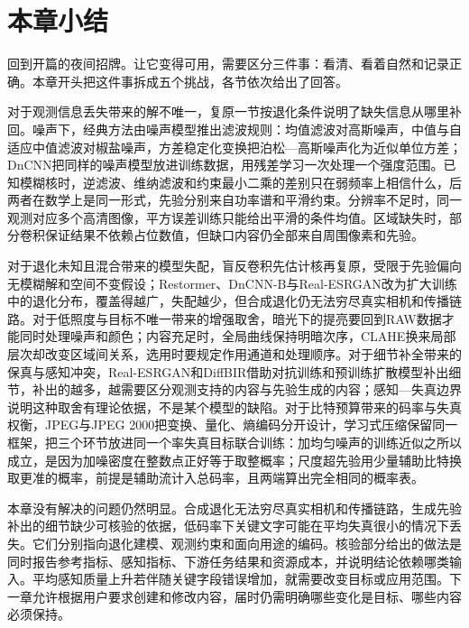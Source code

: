 \section{本章小结}
\label{sec:vision-restoration-summary}

回到开篇的夜间招牌。让它变得可用，需要区分三件事：看清、看着自然和记录正确。本章开头把这件事拆成五个挑战，各节依次给出了回答。

对于观测信息丢失带来的解不唯一，复原一节按退化条件说明了缺失信息从哪里补回。噪声下，经典方法由噪声模型推出滤波规则：均值滤波对高斯噪声，中值与自适应中值滤波对椒盐噪声，方差稳定化变换把泊松—高斯噪声化为近似单位方差；DnCNN把同样的噪声模型放进训练数据，用残差学习一次处理一个强度范围。已知模糊核时，逆滤波、维纳滤波和约束最小二乘的差别只在弱频率上相信什么，后两者在数学上是同一形式，先验分别来自功率谱和平滑约束。分辨率不足时，同一观测对应多个高清图像，平方误差训练只能给出平滑的条件均值。区域缺失时，部分卷积保证结果不依赖占位数值，但缺口内容仍全部来自周围像素和先验。

对于退化未知且混合带来的模型失配，盲反卷积先估计核再复原，受限于先验偏向无模糊解和空间不变假设；Restormer、DnCNN-B与Real-ESRGAN改为扩大训练中的退化分布，覆盖得越广，失配越少，但合成退化仍无法穷尽真实相机和传播链路。对于低照度与目标不唯一带来的增强取舍，暗光下的提亮要回到RAW数据才能同时处理噪声和颜色；内容充足时，全局曲线保持明暗次序，CLAHE换来局部层次却改变区域间关系，选用时要规定作用通道和处理顺序。对于细节补全带来的保真与感知冲突，Real-ESRGAN和DiffBIR借助对抗训练和预训练扩散模型补出细节，补出的越多，越需要区分观测支持的内容与先验生成的内容；感知—失真边界说明这种取舍有理论依据，不是某个模型的缺陷。对于比特预算带来的码率与失真权衡，JPEG与JPEG 2000把变换、量化、熵编码分开设计，学习式压缩保留同一框架，把三个环节放进同一个率失真目标联合训练：加均匀噪声的训练近似之所以成立，是因为加噪密度在整数点正好等于取整概率；尺度超先验用少量辅助比特换取更准的概率，前提是辅助流计入总码率，且两端算出完全相同的概率表。

本章没有解决的问题仍然明显。合成退化无法穷尽真实相机和传播链路，生成先验补出的细节缺少可核验的依据，低码率下关键文字可能在平均失真很小的情况下丢失。它们分别指向退化建模、观测约束和面向用途的编码。核验部分给出的做法是同时报告参考指标、感知指标、下游任务结果和资源成本，并说明结论依赖哪类输入。平均感知质量上升若伴随关键字段错误增加，就需要改变目标或应用范围。下一章允许根据用户要求创建和修改内容，届时仍需明确哪些变化是目标、哪些内容必须保持。

